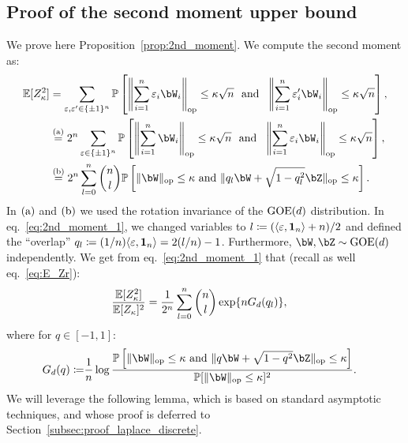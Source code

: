 \subsection{Proof of the second moment upper bound}
\label{subsec:proof_2nd_moment}

We prove here Proposition~\ref{prop:2nd_moment}.
We compute the second moment as: 
\begin{align}\label{eq:2nd_moment_1}
    \nonumber
    \EE[Z_\kappa^2] &= \sum_{\eps, \eps' \in \{\pm 1\}^n} \bbP\left[\left\|\sum_{i=1}^n \eps_i \bW_i\right\|_\op \leq \kappa \sqrt{n} \, \, \textrm{ and } \, \,\left\|\sum_{i=1}^n \eps'_i \bW_i\right\|_\op \leq \kappa \sqrt{n}\right], \\ 
    \nonumber
    &\aeq 2^n \sum_{\eps \in \{\pm 1\}^n} \bbP\left[\left\|\sum_{i=1}^n \bW_i\right\|_\op \leq \kappa \sqrt{n} \, \, \textrm{ and } \, \,\left\|\sum_{i=1}^n \eps_i \bW_i\right\|_\op \leq \kappa \sqrt{n}\right], \\
    &\beq 2^n \sum_{l=0}^n \binom{n}{l} \bbP\left[\|\bW\|_\op \leq \kappa \textrm{ and } \|q_l \bW + \sqrt{1-q_l^2} \bZ\|_\op \leq \kappa\right].
\end{align}
In $(\rm a)$ and $(\rm b)$ we used the rotation invariance of the $\mathrm{GOE}(d)$ distribution. In eq.~\eqref{eq:2nd_moment_1}, 
we changed variables to $l \coloneqq (\langle \varepsilon, \mathbf{1}_n\rangle + n)/2$ and defined the ``overlap'' $q_l \coloneqq (1/n) \langle \varepsilon, \mathbf{1}_n \rangle = 2 (l/n) - 1$.
Furthermore, $\bW, \bZ \sim \GOE(d)$ independently. 
We get from eq.~\eqref{eq:2nd_moment_1} that (recall as well eq.~\eqref{eq:E_Zr}):
\begin{align}\label{eq:2nd_moment_2}
    \frac{\mathbb{E}[Z_\kappa^2]}{\mathbb{E}[Z_\kappa]^2} &= \frac{1}{2^n} \sum_{l=0}^n \binom{n}{l} \exp\{n G_d(q_l)\}, 
\end{align}
where for $q \in [-1,1]$:
\begin{align}\label{eq:def_Gd}
    G_d(q) \coloneqq&  
    \frac{1}{n} \log \frac{\bbP\left[\|\bW\|_\op \leq \kappa \textrm{ and } \|q \bW + \sqrt{1-q^2} \bZ\|_\op \leq \kappa\right]}{\bbP[\|\bW\|_\op \leq \kappa]^2}.
\end{align}
We will leverage the following lemma, which is based on standard asymptotic techniques, 
and whose proof is deferred to Section~\ref{subsec:proof_laplace_discrete}.
